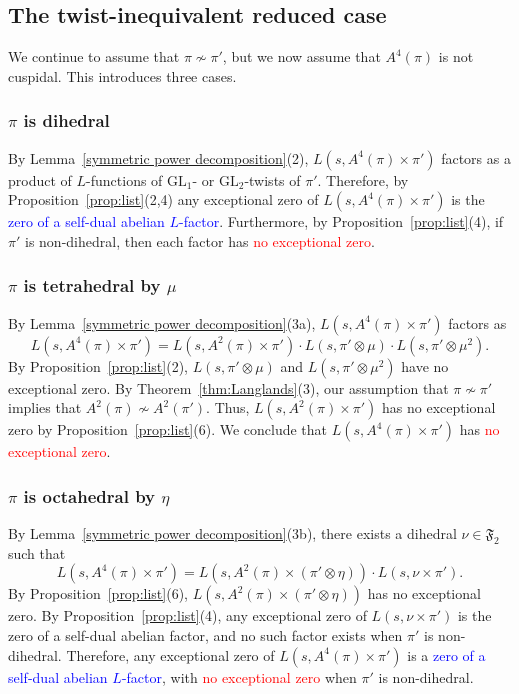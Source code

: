 \documentclass[11pt]{amsart}
\theoremstyle{remark}
\newcommand{\GL}{\mathrm{GL}}
\numberwithin{equation}{section}
\begin{document}
\subsection{The twist-inequivalent reduced case}
We continue to assume that $\pi \not\sim \pi'$, but we now assume that $A^4(\pi)$ is not cuspidal. This introduces three cases.
\subsubsection{$\pi$ is dihedral}
By Lemma~\ref{symmetric power decomposition}(2), $L(s,A^4(\pi) \times \pi')$ factors as a product of $L$-functions of $\GL_1$- or $\GL_2$-twists of $\pi'$. Therefore, by Proposition~\ref{prop:list}(2,4) any exceptional zero of $L(s,A^4(\pi) \times \pi')$ is the \textcolor{blue}{zero of a self-dual abelian $L$-factor}.  Furthermore, by Proposition~\ref{prop:list}(4), if $\pi'$ is non-dihedral, then each factor has \textcolor{red}{no exceptional zero}.
\subsubsection{$\pi$ is tetrahedral by $\mu$}
By Lemma~\ref{symmetric power decomposition}(3a), $L(s,A^4(\pi) \times \pi')$ factors as 
\[
L(s,A^4(\pi) \times \pi') = L(s,A^2(\pi) \times \pi') \cdot L(s,\pi' \otimes \mu) \cdot L(s,\pi' \otimes \mu^2).
\]
By Proposition~\ref{prop:list}(2), $L(s,\pi' \otimes \mu)$ and $L(s,\pi' \otimes \mu^2)$ have no exceptional zero.  By Theorem~\ref{thm:Langlands}(3), our assumption that $\pi \not\sim \pi'$ implies that $A^2(\pi) \not\sim A^2(\pi')$.  Thus, $L(s,A^2(\pi) \times \pi')$ has no exceptional zero by Proposition~\ref{prop:list}(6). We conclude that $L(s,A^4(\pi) \times \pi')$ has \textcolor{red}{no exceptional zero}.
\subsubsection{$\pi$ is octahedral by $\eta$}
By Lemma~\ref{symmetric power decomposition}(3b), there exists a dihedral $\nu\in\mathfrak{F}_2$ such that
\[
L(s,A^4(\pi) \times \pi')  = L(s,A^2(\pi) \times (\pi' \otimes \eta)) \cdot L(s,\nu \times \pi').
\]
By Proposition~\ref{prop:list}(6), $L(s,A^2(\pi) \times (\pi' \otimes \eta))$ has no exceptional zero.  By Proposition~\ref{prop:list}(4), any exceptional zero of $L(s,\nu \times \pi')$ is the zero of a self-dual abelian factor, and no such factor exists when $\pi'$ is non-dihedral.  Therefore, any exceptional zero of $L(s,A^4(\pi) \times \pi')$ is a \textcolor{blue}{zero of a self-dual abelian $L$-factor}, with \textcolor{red}{no exceptional zero} when $\pi'$ is non-dihedral.
\end{document}
